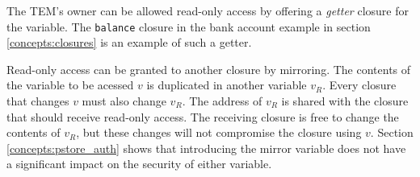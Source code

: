 The TEM's owner can be allowed read-only access by offering a \textit{getter}
closure for the variable. The \texttt{balance} closure in the bank account
example in section \ref{concepts:closures} is an example of such a getter.

Read-only access can be granted to another closure by mirroring. The
contents of the variable to be acessed $v$ is duplicated in another variable
$v_R$. Every closure that changes $v$ must also change $v_R$. The address of
$v_R$ is shared with the closure that should receive read-only access. The
receiving closure is free to change the contents of $v_R$, but these changes
will not compromise the closure using $v$. Section \ref{concepts:pstore_auth}
shows that introducing the mirror variable does not have a significant impact
on the security of either variable.

